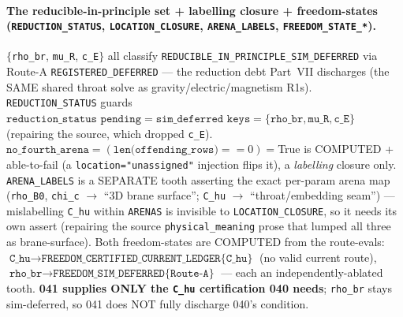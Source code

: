 \paragraph{The reducible-in-principle set + labelling closure + freedom-states (\texttt{REDUCTION\_STATUS}, \texttt{LOCATION\_CLOSURE}, \texttt{ARENA\_LABELS}, \texttt{FREEDOM\_STATE\_*}).}
\(\{\)\texttt{rho\_br}, \texttt{mu\_R}, \texttt{c\_E}\(\}\) all classify
\texttt{REDUCIBLE\_IN\_PRINCIPLE\_SIM\_DEFERRED} via Route-A
\texttt{REGISTERED\_DEFERRED} --- the reduction debt Part~VII discharges (the
SAME shared throat solve as gravity/electric/magnetism R1s).
\texttt{REDUCTION\_STATUS} guards
\(\texttt{reduction\_status pending}=\texttt{sim\_deferred keys}=\{\texttt{rho\_br},\texttt{mu\_R},\texttt{c\_E}\}\)
(repairing the source, which dropped \texttt{c\_E}).
\(\texttt{no\_fourth\_arena}=(\texttt{len(offending\_rows)}==0)=\)True is COMPUTED
+ able-to-fail (a \texttt{location="unassigned"} injection flips it), a
\emph{labelling} closure only. \texttt{ARENA\_LABELS} is a SEPARATE tooth
asserting the exact per-param arena map (\texttt{rho\_B0}, \texttt{chi\_c} \(\to\)
``3D brane surface''; \texttt{C\_hu} \(\to\) ``throat/embedding seam'') ---
mislabelling \texttt{C\_hu} within \texttt{ARENAS} is invisible to
\texttt{LOCATION\_CLOSURE}, so it needs its own assert (repairing the source
\texttt{physical\_meaning} prose that lumped all three as brane-surface). Both
freedom-states are COMPUTED from the route-evals:
\(\texttt{C\_hu}\to\texttt{FREEDOM\_CERTIFIED\_CURRENT\_LEDGER\{C\_hu\}}\) (no valid
current route),
\(\texttt{rho\_br}\to\texttt{FREEDOM\_SIM\_DEFERRED\{Route-A\}}\) --- each an
independently-ablated tooth. \textbf{041 supplies ONLY the \texttt{C\_hu}
certification 040 needs}; \texttt{rho\_br} stays sim-deferred, so 041 does NOT
fully discharge 040's condition.

